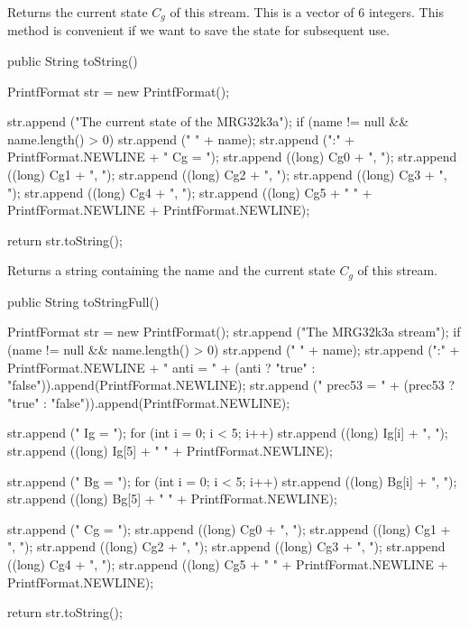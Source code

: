  \begin{tabb} Returns the current state $C_g$ of this stream.
  This is a vector of 6 integers. %
  This method is convenient if we want to save the state for
  subsequent use.
 \end{tabb}
\begin{htmlonly}
\end{htmlonly}
\begin{code}

   public String toString() \begin{hide} {
      PrintfFormat str = new PrintfFormat();

      str.append ("The current state of the MRG32k3a");
      if (name != null && name.length() > 0)
         str.append (" " + name);
      str.append (":" + PrintfFormat.NEWLINE + "   Cg = { ");
      str.append ((long) Cg0 + ", ");
      str.append ((long) Cg1 + ", ");
      str.append ((long) Cg2 + ", ");
      str.append ((long) Cg3 + ", ");
      str.append ((long) Cg4 + ", ");
      str.append ((long) Cg5 + " }" + PrintfFormat.NEWLINE +
          PrintfFormat.NEWLINE);

      return str.toString();
   }\end{hide}
\end{code}
 \begin{tabb} Returns a string containing the name and the current state $C_g$
   of this stream.
 \end{tabb}
\begin{htmlonly}
\end{htmlonly}
\begin{code}

   public String toStringFull() \begin{hide} {
      PrintfFormat str = new PrintfFormat();
      str.append ("The MRG32k3a stream");
      if (name != null && name.length() > 0)
         str.append (" " + name);
      str.append (":" + PrintfFormat.NEWLINE + "   anti = " +
         (anti ? "true" : "false")).append(PrintfFormat.NEWLINE);
      str.append ("   prec53 = " + (prec53 ? "true" : "false")).append(PrintfFormat.NEWLINE);

      str.append ("   Ig = { ");
      for (int i = 0; i < 5; i++)
         str.append ((long) Ig[i] + ", ");
      str.append ((long) Ig[5] + " }" + PrintfFormat.NEWLINE);

      str.append ("   Bg = { ");
      for (int i = 0; i < 5; i++)
         str.append ((long) Bg[i] + ", ");
      str.append ((long) Bg[5] + " }" + PrintfFormat.NEWLINE);

      str.append ("   Cg = { ");
      str.append ((long) Cg0 + ", ");
      str.append ((long) Cg1 + ", ");
      str.append ((long) Cg2 + ", ");
      str.append ((long) Cg3 + ", ");
      str.append ((long) Cg4 + ", ");
      str.append ((long) Cg5 + " }" + PrintfFormat.NEWLINE +
          PrintfFormat.NEWLINE);

      return str.toString();
   }\end{hide}
\end{code}
